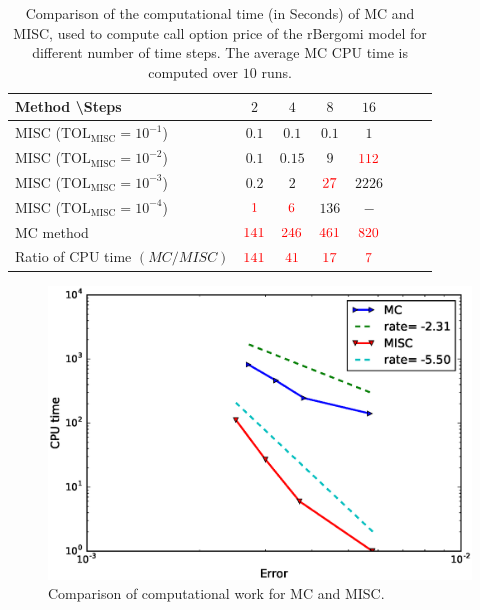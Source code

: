 \FloatBarrier
\begin{table}[h!]
	\centering
	\begin{tabular}{l*{6}{c}r}
		Method \textbackslash  Steps            & $2$ & $4$ & $8$ & $16$ &   \\
		\hline
		MISC ($\text{TOL}_{\text{MISC}}=10^{-1}$)  & $0.1$ & $0.1$ & $0.1$ & $1$ \\
		MISC ($\text{TOL}_{\text{MISC}}=10^{-2}$)  & $0.1$ & $0.15$ & $9$ & $\red{112}$ \\
		MISC ($\text{TOL}_{\text{MISC}}=10^{-3}$)  & $0.2$ & $2$ & $\red{27}$ & $2226$ \\
		MISC ($\text{TOL}_{\text{MISC}}=10^{-4}$)  & $\red{1}$ & $\red{6}$ & $136$ & $-$\\
		\hline
		MC method   & $ \red{141}
		
		$  & $  \red{246}$  & $  \red{461}$ & $ \red{820}
		$  \\	
		\hline
		Ratio of CPU time  $\left(MC/MISC \right)$ & $ \red{141}
		
		$  & $  \red{
			41
		}$  & $  \red{    17
		}$ & $ \red{ 7}
		$  \\	
%		
		\hline
	\end{tabular}
	\caption{Comparison of the computational time (in Seconds) of  MC and MISC, used to compute call option price of the rBergomi model for different number of time steps. The average  MC CPU time is computed over $10$ runs. }
	\label{Comparsion of the computational time of  MC and MISC, used to compute Call option price of rBergomi model for different number of time steps. Case set4}
\end{table}


\FloatBarrier

	\begin{figure}[h!]
	\centering
	\includegraphics[width=0.5\linewidth]{./figures/rBergomi_Complexity_rates/set6/error_vs_time_set6}
	
	\caption{Comparison of computational work for MC and MISC.}
	\label{fig:Complexity plot for MC and MISC for case set $4$ parameters}
\end{figure}
\FloatBarrier
